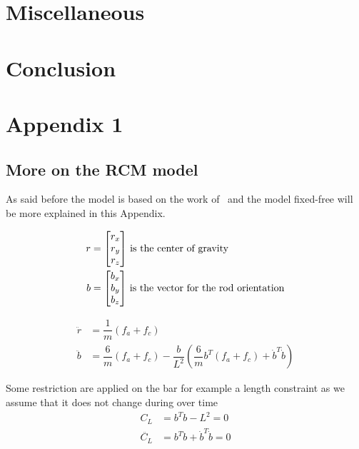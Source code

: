 \documentclass[twoside,12pt]{report} %
\begin{document}
\chapter{Miscellaneous}


\chapter*{Conclusion}

{
\printglossaries
{}
}
\chapter*{Appendix 1}
\section*{More on the RCM model}

As said before the model is based on the work of~\cite{johansen2007modelling} and the model fixed-free will be more explained in this Appendix.

\begin{align}
r &= \begin{bmatrix}
    r_x \\
    r_y \\
    r_z
\end{bmatrix}\, \textnormal{is the center of gravity}\\
b &= \begin{bmatrix}
    b_x \\
    b_y \\
    b_z
\end{bmatrix}\, \textnormal{is the vector for the rod orientation}
\end{align}


\begin{align}
\ddot{r} &= \dfrac{1}{m}  (f_a+f_c) \nonumber\\
\ddot{b} &=  \dfrac{6}{m}(f_a+f_c) - \dfrac{b}{L^{2}}  (\dfrac{6}{m}b^{T}(f_a+f_c)+\dot{b}^{T}\dot{b}) 
\end{align}

Some restriction are applied on the bar for example a length constraint as we assume that it does not change during over time
\begin{align}
C_L &= b^T b-L^2=0 \\
\ddot{C_L} &= b^T \ddot{b}+\dot{b}^T \dot{b}=0 \\
\end{align}
\end{document}
